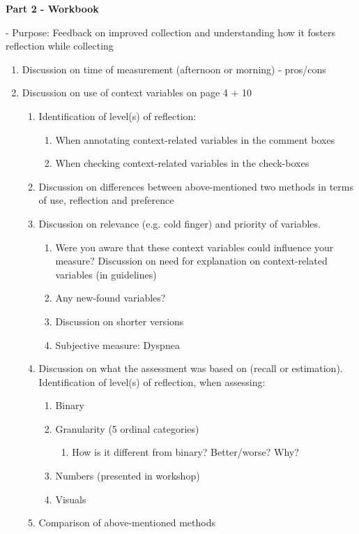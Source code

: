 \textbf{Part 2 - Workbook}

- Purpose: Feedback on improved collection and understanding how it fosters reflection while collecting

\begin{enumerate}
\item Discussion on time of measurement (afternoon or morning) - pros/cons
\item Discussion on use of context variables on page 4 + 10
\begin{enumerate}
	\item Identification of level(s) of reflection:
	\begin{enumerate}
		\item When annotating context-related variables in the comment boxes
		\item When checking context-related variables in the check-boxes 
	\end{enumerate}
	\item Discussion on differences between above-mentioned two methods in terms of use, reflection and preference
	\item Discussion on relevance (e.g. cold finger) and priority of variables. 
	\begin{enumerate}
		\item Were you aware that these context variables could influence your measure? Discussion on need for explanation on context-related variables (in guidelines) 
		\item Any new-found variables?
		\item Discussion on shorter versions 
		\item Subjective measure: Dyspnea
	\end{enumerate}
	\item Discussion on what the assessment was based on (recall or estimation). Identification of level(s) of reflection, when assessing:
	\begin{enumerate}
		\item Binary
		\item Granularity (5 ordinal categories)
		\begin{enumerate}
			\item How is it different from binary? Better/worse? Why?
		\end{enumerate}
		\item Numbers (presented in workshop)
		\item Visuals
	\end{enumerate}
	\item Comparison of above-mentioned methods

\end{enumerate}
\end{enumerate}
